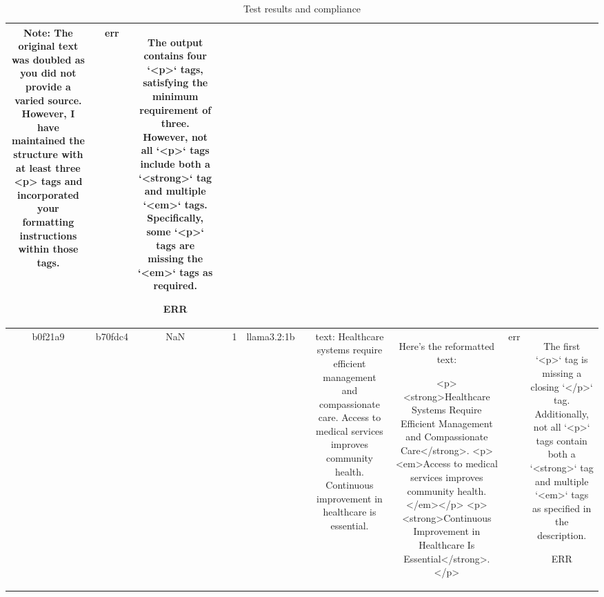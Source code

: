 \begin{table}[h!]
\begin{tabular}{|c|c|c|c|c|c|c|c|c|c|c|}
Note: The original text was doubled as you did not provide a varied source. However, I have maintained the structure with at least three <p> tags and incorporated your formatting instructions within those tags. & err & The output contains four `<p>` tags, satisfying the minimum requirement of three. However, not all `<p>` tags include both a `<strong>` tag and multiple `<em>` tags. Specifically, some `<p>` tags are missing the `<em>` tags as required.

ERR\\
\hline
b0f21a9 & b70fdc4 & NaN &  & 1 & llama3.2:1b &  & text: Healthcare systems require efficient management and compassionate care. Access to medical services improves community health. Continuous improvement in healthcare is essential. & Here's the reformatted text:

<p><strong>Healthcare Systems Require Efficient Management and Compassionate Care</strong>. 
<p><em>Access to medical services improves community health.</em></p>
<p><strong>Continuous Improvement in Healthcare Is Essential</strong>.</p> & err & The first `<p>` tag is missing a closing `</p>` tag. Additionally, not all `<p>` tags contain both a `<strong>` tag and multiple `<em>` tags as specified in the description.

ERR
  \end{tabular}
  \caption{Test results and compliance}
  
  \end{table}
  